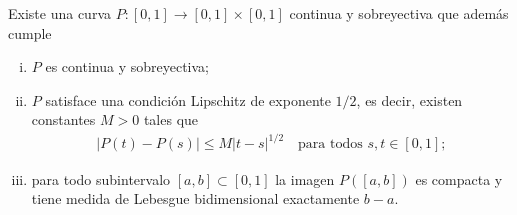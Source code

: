 \begin{homeworkProblem}
  Existe una curva $P:[0,1]\to[0,1]\times[0,1]$ continua y sobreyectiva que además cumple
\begin{enumerate}[(i)]
  \item $P$ es continua y sobreyectiva;
  \item $P$ satisface una condición Lipschitz de exponente $1/2$, es decir, existen constantes $M>0$ tales que
    \begin{align*}
      |P(t)-P(s)|\le M|t-s|^{1/2}\quad\text{para todos }s,t\in[0,1];
    \end{align*}
 \item para todo subintervalo $[a,b]\subset[0,1]$ la imagen $P([a,b])$ es compacta y tiene medida de Lebesgue bidimensional exactamente $b-a$.
\end{enumerate}  
\end{homeworkProblem}
